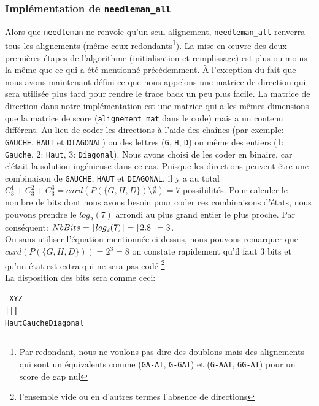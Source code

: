 \documentclass[12pt]{article}
\DeclarePairedDelimiter\ceil{\lceil}{\rceil}
\begin{document}
\subsubsection{Implémentation de \texttt{needleman\_all}}
Alors que \texttt{needleman} ne renvoie qu'un seul alignement, \texttt{needleman\_all} renverra tous les alignements (même ceux redondants\footnote{Par redondant, nous ne voulons pas dire des doublons mais des alignements qui sont un équivalents comme (\texttt{GA-AT}, \texttt{G-GAT}) et (\texttt{G-AAT}, \texttt{GG-AT}) pour un score de gap nul}). La mise en œuvre des deux premières étapes de l'algorithme (initialisation et remplissage) est plus ou moins la même que ce qui a été mentionné précédemment. À l'exception du fait que nous avons maintenant défini ce que nous appelons une matrice de direction qui sera utilisée plus tard pour rendre le trace back un peu plus facile. La matrice de direction dans notre implémentation est une matrice qui a les mêmes dimensions que la matrice de score (\texttt{alignement\_mat} dans le code) mais a un contenu différent. Au lieu de coder les directions à l'aide des chaînes (par exemple: \texttt{GAUCHE}, \texttt{HAUT} et \texttt{DIAGONAL}) ou des lettres (\texttt{G}, \texttt{H}, \texttt{D}) ou même des entiers (1: \texttt{Gauche}, 2: \texttt{Haut}, 3: \texttt{Diagonal}).
Nous avons choisi de les coder en binaire, car c'était la solution ingénieuse dans ce cas. Puisque les directions peuvent être une combinaison de \texttt{GAUCHE}, \texttt{HAUT} et \texttt{DIAGONAL}, il y a au total $C_3^1 + C_3^2 + C_3^3 = card(P(\{G, H, D\}) \setminus \emptyset) = 7$ possibilités.
Pour calculer le nombre de bits dont nous avons besoin pour coder ces combinaisons d'états, nous pouvons prendre le $log_2(7)$ arrondi au plus grand entier le plus proche. Par conséquent: $NbBits = \ceil*{log_2(7)} = \ceil*{2.8} = 3$. \\
Ou sans utiliser l'équation mentionnée ci-dessus, nous pouvons remarquer que $card(P(\{G, H, D\})) = 2^3 = 8$ on constate rapidement qu’il faut 3 bits et qu’un état est extra qui ne sera pas codé \footnote{l'ensemble vide ou en d'autres termes l'absence de directions}.\\
La disposition des bits sera comme ceci: \\
\begin{center}
\texttt{
X\hspace{15mm}Y\hspace{15mm}Z\\
\hspace{2mm}|\hspace{15mm}|\hspace{15mm}|\\
\hspace{5mm}Haut\hspace{4mm}Gauche\hspace{4mm}Diagonal
}
\end{center}
\end{document}
